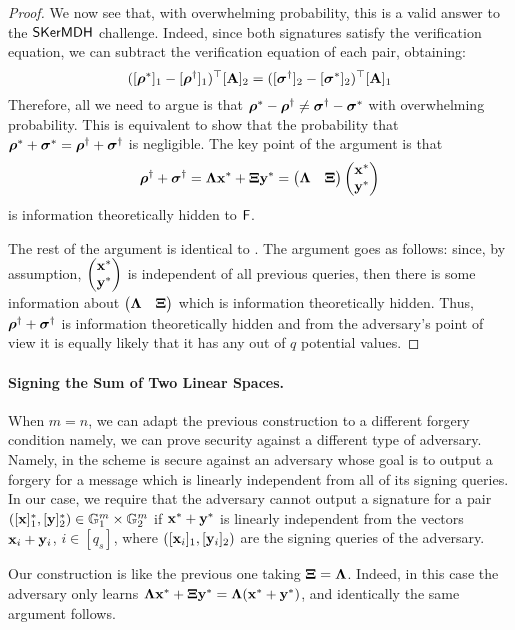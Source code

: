 \begin{proof}
We now see that, with overwhelming probability, this is a valid answer to the $\mathsf{SKerMDH}$ challenge.
Indeed, since both signatures satisfy the verification equation, we can subtract the verification equation of each pair, obtaining:
\begin{equation*}
([{\boldsymbol \rho}^{*}]_1-[{\boldsymbol \rho}^{\dagger}]_1)^{\top} [\mathbf{{A}}]_2=  ([{\boldsymbol \sigma}^{\dagger}]_2-[{\boldsymbol \sigma}^{*}]_2)^{\top} [\mathbf{{A}}]_1
\end{equation*}
Therefore, all we need to argue is that ${\boldsymbol \rho}^{*}-{\boldsymbol \rho}^{\dagger} \neq {\boldsymbol \sigma}^{\dagger}-{\boldsymbol \sigma}^{*}$
with overwhelming probability. This is equivalent to show that  the probability that ${\boldsymbol \rho}^{*}+{\boldsymbol \sigma}^{*} = 
{\boldsymbol \rho}^{\dagger}+ {\boldsymbol \sigma}^{\dagger}$ is negligible.  
The key point of the argument is that 
 \begin{equation*}
 {\boldsymbol \rho}^{\dagger}+ {\boldsymbol \sigma}^{\dagger}=\mathbf{{\Lambda}}\mathbf{x}^*+\mathbf{{\Xi}}\mathbf{y}^*= 
  \begin{pmatrix}  
 {\mathbf{{\Lambda}}} & {\mathbf{{\Xi}}}
 \end{pmatrix}
 \begin{pmatrix}\mathbf{x}^*\\ \mathbf{y}^* \end{pmatrix}
  \end{equation*}
is information theoretically hidden to $\mathsf{F}$. 

The rest of the argument is identical to  \cite{C:LPJY13}. The argument goes as follows: since, by assumption, $\begin{pmatrix}\mathbf{x}^*\\ \mathbf{y}^* \end{pmatrix}$ is independent of all  previous queries, then  there is some information about $\begin{pmatrix}  
 {\mathbf{{\Lambda}}} & {\mathbf{{\Xi}}}
 \end{pmatrix}$ 
which is information theoretically hidden. Thus,  ${\boldsymbol \rho}^{\dagger}+ {\boldsymbol \sigma}^{\dagger}$ is information theoretically hidden and from the adversary's point of view it is equally likely that it has any out of $q$ potential values.  
\end{proof}

\paragraph{Signing the Sum of Two Linear Spaces.} \label{sec:newhom} When $m=n$, we can adapt the previous construction to a different forgery condition namely, we 
can prove security against a different type of adversary. Namely, in  \cite{C:LPJY13} the scheme is secure against an adversary whose goal is to output a forgery for a message which is linearly independent from all of its signing queries. In our case, we require that the adversary cannot output a signature for a pair
$([\mathbf{x}]_1^*,[\mathbf{y}]_2^*) \in \mathbb{G}_1^{m} \times \mathbb{G}_2^{m}$ if $\mathbf{x}^*+\mathbf{y}^*$ is
linearly independent from the 
vectors $\mathbf{x}_i+\mathbf{y}_i$, $i \in [q_s]$, where $([\mathbf{x}_i]_1,[\mathbf{y}_i]_2)$ are the signing queries of the adversary. 

Our construction is like the previous one taking $\mathbf{{\Xi}}=\mathbf{{\Lambda}}$. Indeed, in this case the adversary only learns $\mathbf{{\Lambda}} \mathbf{x}^*+ \mathbf{{\Xi}} \mathbf{y}^*=\mathbf{{\Lambda}} (\mathbf{x}^*+\mathbf{y}^*)$, and identically the same argument follows. 
